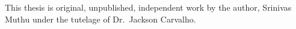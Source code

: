 \documentclass[12pt]{uthesis-v12}  %
\begin{document}

\begin{preface}
This thesis is original, unpublished, independent work by the author, Srinivas Muthu under the tutelage of Dr.~Jackson Carvalho.
\end{preface}



\makebody   %

\end{document}
